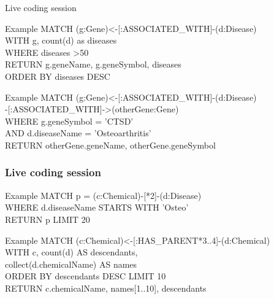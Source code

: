 \documentclass[12pt]{beamer}
\begin{document}
    \begin{frame}{Live coding session}
        \begin{block}{Example}
            MATCH (g:Gene)\textless-[:ASSOCIATED\_WITH]-(d:Disease)\\
            \hspace{1cm} WITH g, count(d) as diseases\\
            \hspace{1cm} WHERE diseases \textgreater 50\\
            \hspace{1cm} RETURN g.geneName, g.geneSymbol, diseases\\
            \hspace{1cm} ORDER BY diseases DESC
        \end{block}
        \begin{block}{Example}
            MATCH (g:Gene)\textless-[:ASSOCIATED\_WITH]-(d:Disease)\\
            \hspace{1cm}-[:ASSOCIATED\_WITH]-\textgreater(otherGene:Gene)\\
            \hspace{1cm} WHERE g.geneSymbol = 'CTSD'\\
            \hspace{1cm} AND d.diseaseName = 'Osteoarthritis'\\
            RETURN otherGene.geneName, otherGene.geneSymbol
        \end{block}
    \end{frame}
    
    \begin{frame}
        \frametitle{Live coding session}
        \begin{block}{Example}
            MATCH p = (c:Chemical)-[*2]-(d:Disease)\\
            \hspace{1cm} WHERE d.diseaseName STARTS WITH 'Osteo'\\
            \hspace{1cm} RETURN p LIMIT 20
        \end{block}
        \begin{block}{Example}
            MATCH (c:Chemical)\textless-[:HAS\_PARENT*3..4]-(d:Chemical)\\ 
            \hspace{1cm} WITH c, count(d) AS descendants,\\
            \hspace{1cm} collect(d.chemicalName) AS names\\
            \hspace{1cm} ORDER BY descendants DESC LIMIT 10\\
            RETURN c.chemicalName, names[1..10], descendants
        \end{block}
    \end{frame}
    
\end{document}
